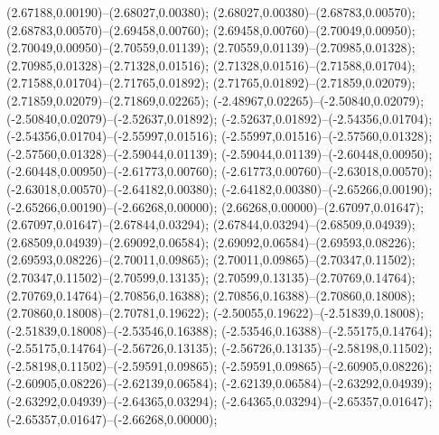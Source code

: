 (2.67188,0.00190)--(2.68027,0.00380);
 (2.68027,0.00380)--(2.68783,0.00570);
 (2.68783,0.00570)--(2.69458,0.00760);
 (2.69458,0.00760)--(2.70049,0.00950);
 (2.70049,0.00950)--(2.70559,0.01139);
 (2.70559,0.01139)--(2.70985,0.01328);
 (2.70985,0.01328)--(2.71328,0.01516);
 (2.71328,0.01516)--(2.71588,0.01704);
 (2.71588,0.01704)--(2.71765,0.01892);
 (2.71765,0.01892)--(2.71859,0.02079);
 (2.71859,0.02079)--(2.71869,0.02265);
 (-2.48967,0.02265)--(-2.50840,0.02079);
 (-2.50840,0.02079)--(-2.52637,0.01892);
 (-2.52637,0.01892)--(-2.54356,0.01704);
 (-2.54356,0.01704)--(-2.55997,0.01516);
 (-2.55997,0.01516)--(-2.57560,0.01328);
 (-2.57560,0.01328)--(-2.59044,0.01139);
 (-2.59044,0.01139)--(-2.60448,0.00950);
 (-2.60448,0.00950)--(-2.61773,0.00760);
 (-2.61773,0.00760)--(-2.63018,0.00570);
 (-2.63018,0.00570)--(-2.64182,0.00380);
 (-2.64182,0.00380)--(-2.65266,0.00190);
 (-2.65266,0.00190)--(-2.66268,0.00000);
 (2.66268,0.00000)--(2.67097,0.01647);
 (2.67097,0.01647)--(2.67844,0.03294);
 (2.67844,0.03294)--(2.68509,0.04939);
 (2.68509,0.04939)--(2.69092,0.06584);
 (2.69092,0.06584)--(2.69593,0.08226);
 (2.69593,0.08226)--(2.70011,0.09865);
 (2.70011,0.09865)--(2.70347,0.11502);
 (2.70347,0.11502)--(2.70599,0.13135);
 (2.70599,0.13135)--(2.70769,0.14764);
 (2.70769,0.14764)--(2.70856,0.16388);
 (2.70856,0.16388)--(2.70860,0.18008);
 (2.70860,0.18008)--(2.70781,0.19622);
 (-2.50055,0.19622)--(-2.51839,0.18008);
 (-2.51839,0.18008)--(-2.53546,0.16388);
 (-2.53546,0.16388)--(-2.55175,0.14764);
 (-2.55175,0.14764)--(-2.56726,0.13135);
 (-2.56726,0.13135)--(-2.58198,0.11502);
 (-2.58198,0.11502)--(-2.59591,0.09865);
 (-2.59591,0.09865)--(-2.60905,0.08226);
 (-2.60905,0.08226)--(-2.62139,0.06584);
 (-2.62139,0.06584)--(-2.63292,0.04939);
 (-2.63292,0.04939)--(-2.64365,0.03294);
 (-2.64365,0.03294)--(-2.65357,0.01647);
 (-2.65357,0.01647)--(-2.66268,0.00000);
